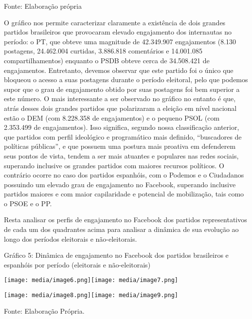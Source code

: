 Fonte: Elaboração própria

O gráfico nos permite caracterizar claramente a existência de dois
grandes partidos brasileiros que provocaram elevado engajamento dos
internautas no período: o PT, que obteve uma magnitude de 42.349.907
engajamentos (8.130 postagens, 24.462.004 curtidas, 3.886.818
comentários e 14.001.085 compartilhamentos) enquanto o PSDB obteve cerca
de 34.508.421 de engajamentos. Entretanto, devemos observar que este
partido foi o único que bloqueou o acesso a suas postagens durante o
período eleitoral, pelo que podemos supor que o grau de engajamento
obtido por suas postagens foi bem superior a este número. O mais
interessante a ser observado no gráfico no entanto é que, atrás desses
dois grandes partidos que polarizaram a eleição em nível nacional estão
o DEM (com 8.228.358 de engajamentos) e o pequeno PSOL (com 2.353.499 de
engajamentos). Isso significa, segundo nossa classificação anterior, que
partidos com perfil ideológico e programático mais definido,
``buscadores de políticas públicas'', e que possuem uma postura mais
proativa em defenderem seus pontos de vista, tendem a ser mais atuantes
e populares nas redes sociais, superando inclusive os grandes partidos
com maiores recursos políticos. O contrário ocorre no caso dos partidos
espanhóis, com o Podemos e o Ciudadanos possuindo um elevado grau de
engajamento no Facebook, superando inclusive partidos maiores e com
maior capilaridade e potencial de mobilização, tais como o PSOE e o PP.

Resta analisar os perfis de engajamento no Facebook dos partidos
representativos de cada um dos quadrantes acima para analisar a dinâmica
de sua evolução ao longo dos períodos eleitorais e não-eleitorais.

Gráfico 5: Dinâmica de engajamento no Facebook dos partidos brasileiros
e espanhóis por período (eleitorais e não-eleitorais)

\texttt{[image: media/image6.png]}\texttt{[image: media/image7.png]}

\texttt{[image: media/image8.png]}\texttt{[image: media/image9.png]}

Fonte: Elaboração Própria.

